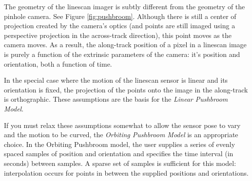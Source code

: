 The geometry of the linescan imager is subtly different from the
geometry of the pinhole camera.  See Figure \ref{fig:pushbroom}.
Although there is still a center of projection created by the camera's
optics (and points are still imaged using a perspective projection in
the across-track direction), this point moves as the camera moves.  As
a result, the along-track position of a pixel in a linescan image is
purely a function of the extrinsic parameters of the camera: it's
position and orientation, both a function of time.  

In the special case where the motion of the linescan sensor is linear
and its orientation is fixed, the projection of the points onto the
image in the along-track is orthographic.  These assumptions are the
basis for the {\em Linear Pushbroom Model}.  

If you must relax these assumptions somewhat to allow the sensor pose
to vary and the motion to be curved, the {\em Orbiting Pushbroom
  Model} is an appropriate choice.  In the Orbiting Pushbroom model,
the user supplies a series of evenly spaced samples of position and
orientation and specifies the time interval (in seconds) between
samples.  A sparse set of samples is sufficient for this model:
interpolation occurs for points in between the supplied positions and
orientations.


